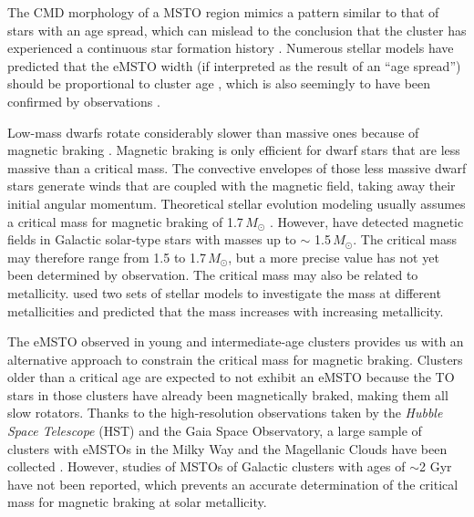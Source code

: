\documentclass[twocolumn]{aastex631}
\begin{document}
The CMD morphology of a MSTO region mimics a pattern similar to that of stars with an age spread, which can mislead to the conclusion that the cluster has experienced a continuous star formation history \citep{mackey2007double, Mackey2008Multiple, milone2009multiple, goudfrooij2014extended}. Numerous stellar models have predicted that the eMSTO width (if interpreted as the result of an ``age spread'') should be proportional to cluster age \citep{2013ApJ...776..112Y}, which is also seemingly to have been confirmed by observations \citep{niederhofer2015apparent,bastian2016young,bastian2018extended}. 

Low-mass dwarfs rotate considerably slower than massive ones because of magnetic braking \citep{1962AnAp...25...18S,1987MNRAS.226...57M}. Magnetic braking is only efficient for dwarf stars that are less massive than a critical mass. The convective envelopes of those less massive dwarf stars generate winds that are coupled with the magnetic field, taking away their initial angular momentum. Theoretical stellar evolution modeling usually assumes a critical mass for magnetic braking of  1.7\,$M_\odot$  \citep{2019A&A...627A..24G}. However, \citet{2009Magnetic} have detected magnetic fields in Galactic solar-type stars with masses up to $\sim$ 1.5\,$M_\odot$. The critical mass may therefore range from 1.5 to 1.7\,$M_\odot$, but a more precise value has not yet been determined by observation. The critical mass may also be related to metallicity. \citet{georgy2019disappearance} used two sets of stellar models to investigate the mass at different metallicities and predicted that the mass increases with increasing metallicity. 

The eMSTO observed in young and intermediate-age clusters provides us with an alternative approach to constrain the critical mass for magnetic braking. Clusters older than a critical age are expected to not exhibit an eMSTO because the TO stars in those clusters have already been magnetically braked, making them all slow rotators. Thanks to the high-resolution observations taken by the {\it Hubble Space Telescope} (HST) and the Gaia Space Observatory, a large sample of clusters with eMSTOs in the Milky Way and the Magellanic Clouds have been collected \citep{milone2015multiple, 2017ApJ...844..119L,2018ApJ...863L..33M,cordoni2018extended,2018MNRAS.477.4696M}. However, studies of MSTOs of Galactic clusters with ages of $\sim$2 Gyr have not been reported, which prevents an accurate determination of the critical mass for magnetic braking at solar metallicity. 
\end{document}
